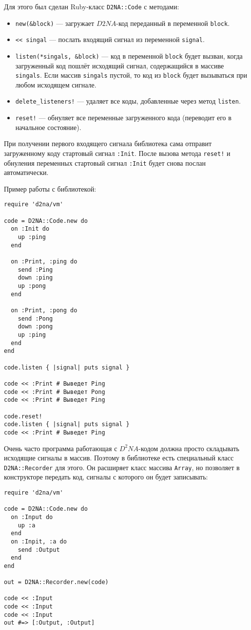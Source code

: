 \documentclass[utf8,a5paper,portrait,10pt,twoside]{eskdtext}
\begin{document}
Для этого был сделан Ruby-класс \texttt{D2NA::Code} с методами:
\begin{itemize}
  \item \texttt{new(\&block)} — загружает $D2NA$-код переданный в переменной
        \texttt{block}.
  \item \texttt{{<}< singal} — послать входящий сигнал из переменной
        \texttt{signal}.
  \item \texttt{listen(*singals, \&block)} — код в переменной \texttt{block} будет
        вызван, когда загруженный код пошлёт исходящий сигнал, содержащийся в
        массиве \texttt{singals}. Если массив \texttt{singals} пустой, то код из
        \texttt{block} будет вызываться при любом исходящем сигнале.
  \item \texttt{delete\_listeners!} — удаляет все коды, добавленные через метод
        \texttt{listen}.
  \item \texttt{reset!} — обнуляет все переменные загруженного кода
        (переводит его в начальное состояние).
\end{itemize}

При получении первого входящего сигнала библиотека сама отправит загруженному
коду стартовый сигнал \texttt{:Init}. После вызова метода \texttt{reset!} и
обнуления переменных стартовый сигнал \texttt{:Init} будет снова послан
автоматически.

Пример работы с библиотекой:
\begin{verbatim}
require 'd2na/vm'

code = D2NA::Code.new do
  on :Init do
    up :ping
  end

  on :Print, :ping do
    send :Ping
    down :ping
    up :pong
  end

  on :Print, :pong do
    send :Pong
    down :pong
    up :ping
  end
end

code.listen { |signal| puts signal }

code << :Print # Выведет Ping
code << :Print # Выведет Pong
code << :Print # Выведет Ping

code.reset!
code.listen { |signal| puts signal }
code << :Print # Выведет Ping
\end{verbatim}

Очень часто программа работающая с $D^2NA$-кодом должна просто складывать
исходящие сигналы в массив. Поэтому в библиотеке есть специальный класс
\texttt{D2NA::Recorder} для этого. Он расширяет класс массива \texttt{Array},
но позволяет в конструкторе передать код, сигналы с которого он будет
записывать:
\begin{verbatim}
require 'd2na/vm'

code = D2NA::Code.new do
  on :Input do
    up :a
  end
  on :Inpit, :a do
    send :Output
  end
end

out = D2NA::Recorder.new(code)

code << :Input
code << :Input
code << :Input
out #=> [:Output, :Output]
\end{verbatim}
\end{document}
